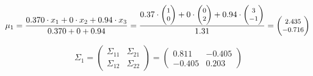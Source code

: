 \documentclass[12pt]{article}
\begin{document}
\begin{enumerate}
        \begin{equation*}
            \fontsize{8pt}{10pt}\selectfont
            \mu_1 = \frac{0.370 \cdot x_1 + 0 \cdot x_2 + 0.94 \cdot x_3}{0.370+0+0.94} = \frac{0.37 \cdot \begin{pmatrix}
            1\\
            0
            \end{pmatrix}+ 0 \cdot \begin{pmatrix}
            0\\
            2
            \end{pmatrix} + 0.94 \cdot \begin{pmatrix}
            3\\
            -1
            \end{pmatrix}}{1.31} = \begin{pmatrix}
            2.435\\
            -0.716
            \end{pmatrix}\\
        \end{equation*}

        \begin{equation*}
            \Sigma_1 = \begin{pmatrix}
                \Sigma_{11} & \Sigma_{21} \\
                \Sigma_{12} & \Sigma_{22}
            \end{pmatrix} = \begin{pmatrix}
                0.811 & -0.405\\
                -0.405 & 0.203
            \end{pmatrix}
        \end{equation*}


\end{enumerate}
\end{document}
